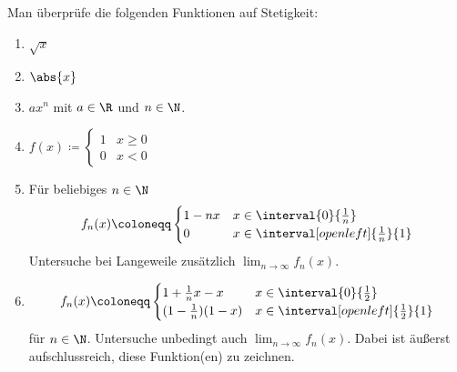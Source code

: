 \begin{exercise}[Stetigkeit]
  Man überprüfe die folgenden Funktionen auf Stetigkeit:
  \begin{enumerate}[label=(\alph*)]
  \item $\sqrt{x}$
  \item $\abs{x}$
  \item $ax^n$ mit $a \in \R$ und $n \in \N$.
  \item
    \( \displaystyle
    f(x) \coloneqq
    \begin{cases}
      1 & x \geq 0\\
      0 & x < 0
    \end{cases}
    \)
  \item Für beliebiges $n \in \N$
    \begin{align*}
      f_n(x) \coloneqq
      \begin{cases}
        1 - nx & x \in \interval{0}{\frac{1}{n}} \\
        0      & x \in \interval[open left]{\frac{1}{n}}{1}
      \end{cases}
    \end{align*}
    Untersuche bei Langeweile zusätzlich $\lim_{n \to \infty} f_n(x)$.
  \item
    \begin{align*}
      f_n(x) \coloneqq
      \begin{cases}
        1 + \frac{1}{n}x - x     & x \in \interval{0}{\frac{1}{2}} \\
        (1 - \frac{1}{n})(1 - x) & x \in \interval[open left]{\frac{1}{2}}{1}
      \end{cases}
    \end{align*}
    für $n \in \N$. Untersuche unbedingt auch $\lim_{n\to\infty} f_n(x)$. Dabei
    ist äußerst aufschlussreich, diese Funktion(en) zu zeichnen.
  \end{enumerate}
\end{exercise}
